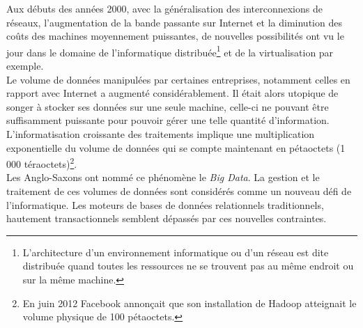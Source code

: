 Aux débuts des années 2000, avec la généralisation des interconnexions de réseaux, l'augmentation de la bande passante sur Internet et la diminution des coûts des machines moyennement puissantes, de nouvelles possibilités ont vu le jour dans le domaine de l'informatique distribuée\footnote{L’architecture d'un environnement informatique ou d'un réseau est dite distribuée quand toutes les ressources ne se trouvent pas au même endroit ou sur la même machine.\cite{Wikipedia_architecture_distribuee}} et de la virtualisation par exemple.\\

Le volume de données manipulées par certaines entreprises, notamment celles en rapport avec Internet a augmenté considérablement. Il était alors utopique de songer à stocker ses données sur une seule machine, celle-ci ne pouvant être suffisamment puissante pour pouvoir gérer une telle quantité d'information. L'informatisation croissante des traitements implique une multiplication exponentielle du volume de données qui se compte maintenant en pétaoctets (1 000 téraoctets)\footnote{En juin 2012 Facebook annonçait que son installation de Hadoop atteignait le volume physique de 100 pétaoctets.\cite{facebook_hadoop}}.\\

Les Anglo-Saxons ont nommé ce phénomène le \textit{Big Data}. La gestion et le traitement de ces volumes de données sont considérés comme un nouveau défi de l'informatique. Les moteurs de bases de données relationnels traditionnels, hautement transactionnels semblent dépassés par ces nouvelles contraintes.